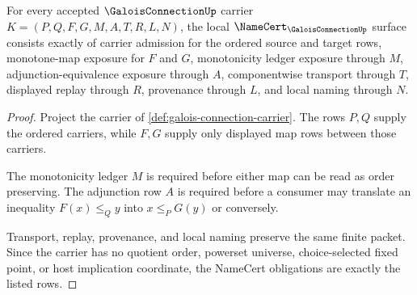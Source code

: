 \begin{theorem}
\label{thm:galois-connection-namecert-obligations}
For every accepted $\GaloisConnectionUp$ carrier $K=(P,Q,F,G,M,A,T,R,L,N)$, the local $\NameCert_{\GaloisConnectionUp}$ surface consists exactly of carrier admission for the ordered source and target rows, monotone-map exposure for $F$ and $G$, monotonicity ledger exposure through $M$, adjunction-equivalence exposure through $A$, componentwise transport through $T$, displayed replay through $R$, provenance through $L$, and local naming through $N$.
\end{theorem}
\begin{proof}
Project the carrier of \autoref{def:galois-connection-carrier}. The rows $P,Q$ supply the ordered carriers, while $F,G$ supply only displayed map rows between those carriers.

The monotonicity ledger $M$ is required before either map can be read as order preserving. The adjunction row $A$ is required before a consumer may translate an inequality $F(x)\leq_Q y$ into $x\leq_P G(y)$ or conversely.

Transport, replay, provenance, and local naming preserve the same finite packet. Since the carrier has no quotient order, powerset universe, choice-selected fixed point, or host implication coordinate, the NameCert obligations are exactly the listed rows.
\end{proof}

